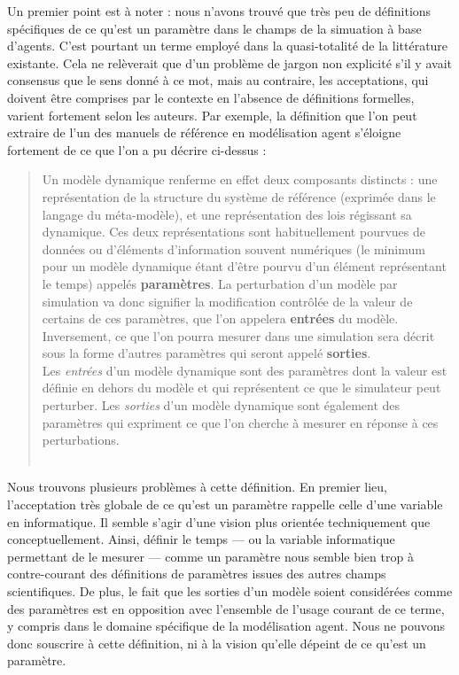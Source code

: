 \documentclass[12pt, a4paper, oneside]{book}
\begin{document}
	Un premier point est à noter : nous n'avons trouvé que très peu de définitions spécifiques de ce qu'est un paramètre dans le champs de la simuation à base d'agents. C'est pourtant un terme employé dans la quasi-totalité de la littérature existante. Cela ne relèverait que d'un problème de jargon non explicité s'il y avait consensus que le sens donné à ce mot, mais au contraire, les acceptations, qui doivent être comprises par le contexte en l'absence de définitions formelles, varient fortement selon les auteurs.
	Par exemple, la définition que l'on peut extraire de l'un des manuels de référence en modélisation agent \autocite{treuil_modelisation_2008} s'éloigne fortement de ce que l'on a pu décrire ci-dessus :
	\begin{quote}
		Un modèle dynamique renferme en effet deux composants distincts : une représentation de la structure du système de référence (exprimée dans le langage du méta-modèle), et une représentation des lois régissant sa dynamique. Ces deux représentations sont habituellement pourvues de données ou d'éléments d'information souvent numériques (le minimum pour un modèle dynamique étant d'être pourvu d'un élément représentant le temps) appelés \textbf{paramètres}. La \og perturbation\fg{} d'un modèle par simulation va donc signifier la modification contrôlée de la valeur de certains de ces paramètres, que l'on appelera \textbf{entrées} du modèle. Inversement, ce que l'on pourra mesurer dans une simulation sera décrit sous la forme d'autres paramètres qui seront appelé \textbf{sorties}.\\
		
		Les \textit{entrées} d'un modèle dynamique sont des paramètres dont la valeur est définie en dehors du modèle et qui représentent ce que le simulateur peut perturber. Les \textit{sorties} d'un modèle dynamique sont également des paramètres qui expriment ce que l'on cherche à mesurer en réponse à ces perturbations.\\
		\mbox{}~ \hfill \autocite[8]{treuil_modelisation_2008}
	\end{quote}

	Nous trouvons plusieurs problèmes à cette définition. En premier lieu, l'acceptation très globale de ce qu'est un paramètre rappelle celle d'une variable en informatique. Il semble s'agir d'une vision plus orientée techniquement que conceptuellement. Ainsi, définir le temps --- ou la variable informatique permettant de le mesurer --- comme un paramètre nous semble bien trop à contre-courant des définitions de paramètres issues des autres champs scientifiques.
	De plus, le fait que les sorties d'un modèle soient considérées comme des paramètres est en opposition avec l'ensemble de l'usage courant de ce terme, y compris dans le domaine spécifique de la modélisation agent. Nous ne pouvons donc souscrire à cette définition, ni à la vision qu'elle dépeint de ce qu'est un paramètre.
	
\end{document}
